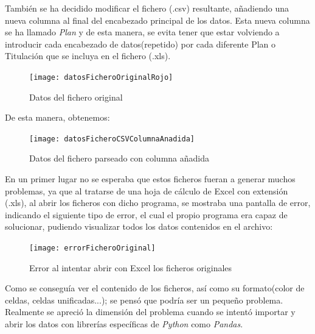 También se ha decidido modificar el fichero (.csv) resultante, añadiendo una nueva columna al final del encabezado principal de los datos. Esta nueva columna se ha llamado \emph{Plan} y de esta manera, se evita tener que estar volviendo a introducir cada encabezado de datos(repetido) por cada diferente Plan o Titulación que se incluya en el fichero (.xls).


\begin{figure}%
	\centering
	\texttt{[image: datosFicheroOriginalRojo]}
	\caption{Datos del fichero original}\label{fig:datosFicheroOriginalRojo}
\end{figure}


De esta manera, obtenemos:


\begin{figure}%
	\centering
	\texttt{[image: datosFicheroCSVColumnaAnadida]}
	\caption{Datos del fichero parseado con columna añadida}\label{fig:datosFicheroCSVColumnaAnadida}
\end{figure}




En un primer lugar no se esperaba que estos ficheros fueran a generar muchos problemas, ya que al tratarse de una hoja de cálculo de Excel con extensión (.xls), al abrir los ficheros con dicho programa, se mostraba una pantalla de error, indicando el siguiente tipo de error, el cual el propio programa era capaz de solucionar, pudiendo visualizar todos los datos contenidos en el archivo:


\begin{figure}%
	\centering
	\texttt{[image: errorFicheroOriginal]}
	\caption{Error al intentar abrir con Excel los ficheros originales}\label{fig:errorFicheroOriginal}
\end{figure}


Como se conseguía ver el contenido de los ficheros, así como su formato(color de celdas, celdas unificadas...); se pensó que podría ser un pequeño problema. Realmente se apreció la dimensión del problema cuando se intentó importar y abrir los datos con librerías específicas de \emph{Python} como \emph{Pandas}.


